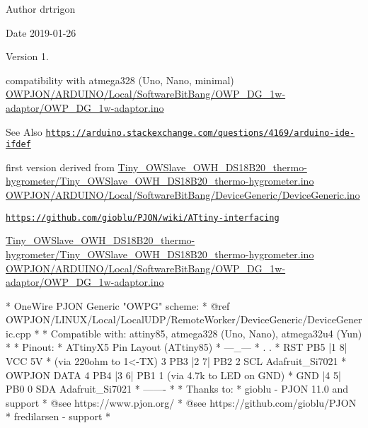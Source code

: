 \begin{DoxyAuthor}{Author}
drtrigon 
\end{DoxyAuthor}
\begin{DoxyDate}{Date}
2019-\/01-\/26 
\end{DoxyDate}
\begin{DoxyVersion}{Version}
1. \begin{DoxyItemize}
\item compatibility with atmega328 (Uno, Nano, minimal) \hyperlink{OWP__DG__1w-adaptor_8ino}{O\-W\-P\-J\-O\-N/\-A\-R\-D\-U\-I\-N\-O/\-Local/\-Software\-Bit\-Bang/\-O\-W\-P\-\_\-\-D\-G\-\_\-1w-\/adaptor/\-O\-W\-P\-\_\-\-D\-G\-\_\-1w-\/adaptor.\-ino} \end{DoxyItemize}

\end{DoxyVersion}
\begin{DoxySeeAlso}{See Also}
\href{https://arduino.stackexchange.com/questions/4169/arduino-ide-ifdef}{\tt https\-://arduino.\-stackexchange.\-com/questions/4169/arduino-\/ide-\/ifdef} \begin{DoxyItemize}
\item first version derived from \hyperlink{Tiny__OWSlave__OWH__DS18B20__thermo-hygrometer_8ino}{Tiny\-\_\-\-O\-W\-Slave\-\_\-\-O\-W\-H\-\_\-\-D\-S18\-B20\-\_\-thermo-\/hygrometer/\-Tiny\-\_\-\-O\-W\-Slave\-\_\-\-O\-W\-H\-\_\-\-D\-S18\-B20\-\_\-thermo-\/hygrometer.\-ino} \hyperlink{ARDUINO_2Local_2SoftwareBitBang_2DeviceGeneric_2DeviceGeneric_8ino}{O\-W\-P\-J\-O\-N/\-A\-R\-D\-U\-I\-N\-O/\-Local/\-Software\-Bit\-Bang/\-Device\-Generic/\-Device\-Generic.\-ino} \end{DoxyItemize}


\href{https://github.com/gioblu/PJON/wiki/ATtiny-interfacing}{\tt https\-://github.\-com/gioblu/\-P\-J\-O\-N/wiki/\-A\-Ttiny-\/interfacing}
\end{DoxySeeAlso}
\hyperlink{Tiny__OWSlave__OWH__DS18B20__thermo-hygrometer_8ino}{Tiny\-\_\-\-O\-W\-Slave\-\_\-\-O\-W\-H\-\_\-\-D\-S18\-B20\-\_\-thermo-\/hygrometer/\-Tiny\-\_\-\-O\-W\-Slave\-\_\-\-O\-W\-H\-\_\-\-D\-S18\-B20\-\_\-thermo-\/hygrometer.\-ino} \hyperlink{OWP__DG__1w-adaptor_8ino}{O\-W\-P\-J\-O\-N/\-A\-R\-D\-U\-I\-N\-O/\-Local/\-Software\-Bit\-Bang/\-O\-W\-P\-\_\-\-D\-G\-\_\-1w-\/adaptor/\-O\-W\-P\-\_\-\-D\-G\-\_\-1w-\/adaptor.\-ino}

\begin{DoxyVerb}* OneWire PJON Generic "OWPG" scheme:
*   @ref OWPJON/LINUX/Local/LocalUDP/RemoteWorker/DeviceGeneric/DeviceGeneric.cpp
*
* Compatible with: attiny85, atmega328 (Uno, Nano), atmega32u4 (Yun)
*
* Pinout:
*                      ATtinyX5 Pin Layout (ATtiny85)
*                                ---_---
*                                .     .
*                        RST PB5 |1   8| VCC      5V
* (via 220ohm to 1<-TX)   3  PB3 |2   7| PB2  2   SCL Adafruit_Si7021
*           OWPJON DATA   4  PB4 |3   6| PB1  1   (via 4.7k to LED on GND)
*                            GND |4   5| PB0  0   SDA Adafruit_Si7021
*                                -------
*
* Thanks to:
* gioblu - PJON 11.0 and support
*          @see https://www.pjon.org/
*          @see https://github.com/gioblu/PJON
* fredilarsen - support
* \end{DoxyVerb}
 

